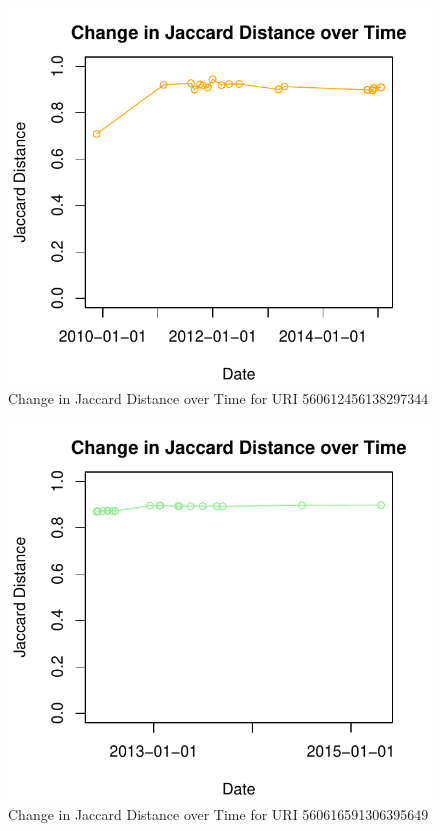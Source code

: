 \documentclass[a4paper,12pt]{article}
\begin{document}
\begin{figure}[H]
    \centering
    \includegraphics{stats/q3/560612456138297344.pdf}
    \caption{Change in Jaccard Distance over Time for URI 560612456138297344}
\end{figure}

\begin{figure}[H]
    \centering
    \includegraphics{stats/q3/560616591306395649.pdf}
    \caption{Change in Jaccard Distance over Time for URI 560616591306395649}
\end{figure}
\end{document}
